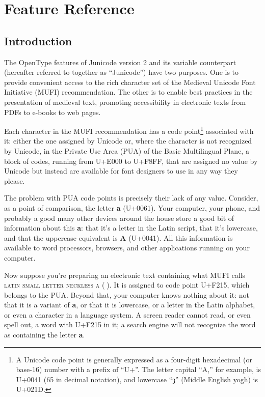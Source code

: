 \documentclass[12pt,letterpaper,openany]{book}
\newcommand\textLetterExample[1]{\textrm{\textbf{\color{BrickRed}#1}}}
\newcommand\textUName[1]{\textsc{#1}}
\newcounter{Feature}
\begin{document}
\hypertarget{FeatureReference}{}\chapter*{\color{RViolet}Feature Reference}

\hypertarget{intro}{}\section{Introduction}
The OpenType features of Junicode version 2 and its variable counterpart (hereafter referred to together as
``Junicode'') have two purposes. One is to provide convenient access to the rich character set of the Medieval Unicode
Font Initiative (MUFI) recommendation. The other is to enable best practices in the presentation of medieval text,
promoting accessibility in electronic texts from PDFs to e-books to web pages.

Each character in the MUFI recommendation has a code point\footnote{A Unicode code point is generally expressed as a
four-digit hexadecimal (or base-16) number with a prefix of ``U+''. The letter capital ``A,'' for example, is U+0041 (65
in decimal notation), and lowercase ``ȝ'' (Middle English yogh) is U+021D.} associated with it: either the one
assigned by Unicode or, where the character is not recognized by Unicode, in the Private Use Area (PUA) of the Basic
Multilingual Plane, a block of codes, running from U+E000 to U+F8FF, that are assigned no value by Unicode but instead
are available for font designers to use in any way they please.

The problem with PUA code points is precisely their lack of any value. Consider, as a point of comparison, the letter
\textLetterExample{a} (U+0061). Your computer, your phone, and probably a good many other devices around the house
store a good bit of information about this \textLetterExample{a}: that it’s a letter in the Latin script, that
it’s lowercase, and that the uppercase equivalent is \textLetterExample{A} (U+0041). All this information is
available to word processors, browsers, and other applications running on your computer.

Now suppose you're preparing an electronic text containing what MUFI calls \textUName{latin small letter neckless
a} (\textLetterExample{}). It is assigned to code point U+F215, which belongs to the PUA. Beyond that, your
computer knows nothing about it: not that it is a variant of \textLetterExample{a}, or that it is lowercase, or a letter in the Latin
alphabet, or even a character in a language system. A screen reader cannot read, or even spell out, a word with U+F215
in it; a search engine will not recognize the word as containing the letter \textLetterExample{a}.
\end{document}
